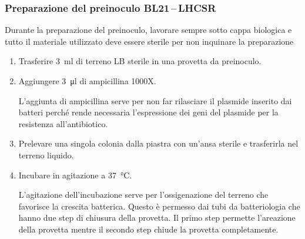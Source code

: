 \subsubsection{Preparazione del preinoculo BL21\texorpdfstring{\,--\,}{--}LHCSR }
\begin{Attenzione}
	Durante la preparazione del preinoculo, lavorare sempre sotto cappa biologica e tutto il materiale utilizzato deve essere sterile per non inquinare la preparazione
\end{Attenzione}
\begin{enumerate}
	\item Trasferire \qty{3}{\ml} di terreno LB sterile in una provetta da preinoculo.
	\item Aggiungere \qty{3}{\micro\litre} di ampicillina 1000X.
	      \begin{Note}
		      L'aggiunta di ampicillina serve per non far rilasciare il plasmide inserito dai batteri perché rende necessaria l'espressione dei geni del plasmide per la resistenza all'antibiotico.
	      \end{Note}
	\item Prelevare una singola colonia dalla piastra con un’ansa sterile e trasferirla nel terreno liquido.
	\item Incubare in agitazione a \qty{37}{\celsius}.
	      \begin{Note}
		      L'agitazione dell'incubazione serve per l'ossigenazione del terreno che favorisce la crescita batterica. Questo è permesso dai tubi da batteriologia che hanno due step di chiusura della provetta. Il primo step permette l'areazione della provetta mentre il secondo step chiude la provetta completamente.
	      \end{Note}
\end{enumerate}

